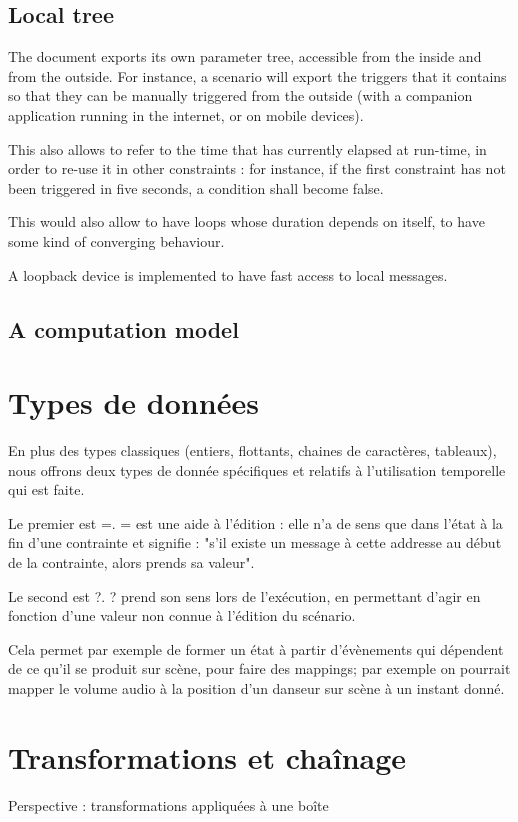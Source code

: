 \documentclass{sigchi}
\begin{document}
\subsection{Local tree}
The document exports its own parameter tree, accessible from the inside and from the outside.
For instance, a scenario will export the triggers that it contains so that they can be manually triggered from the outside (with a companion application running in the internet, or on mobile devices).

This also allows to refer to the time that has currently elapsed at run-time, in order to re-use it in other constraints : for instance, if the first constraint has not been triggered in five seconds, a condition shall become false.

This would also allow to have loops whose duration depends on itself, to have some kind of converging behaviour.

A loopback device is implemented to have fast access to local messages.

\subsection{A computation model}

\section{Types de données}
En plus des types classiques (entiers, flottants, chaines de caractères, tableaux),  nous offrons deux types de donnée spécifiques et relatifs à l'utilisation temporelle qui est faite.

Le premier est =. = est une aide à l'édition : elle n'a de sens que dans l'état à la fin d'une contrainte et signifie : "s'il existe un message à cette addresse au début de la contrainte, alors prends sa valeur".

Le second est ?. ? prend son sens lors de l'exécution, en permettant d'agir en fonction d'une valeur non connue à l'édition du scénario.

Cela permet par exemple de former un état à partir d'évènements qui dépendent de ce qu'il se produit sur scène, pour faire des mappings; par exemple on pourrait mapper le volume audio à la position d'un danseur sur scène à un instant donné.

\section{Transformations et chaînage}
Perspective : transformations appliquées à une boîte
\end{document}
